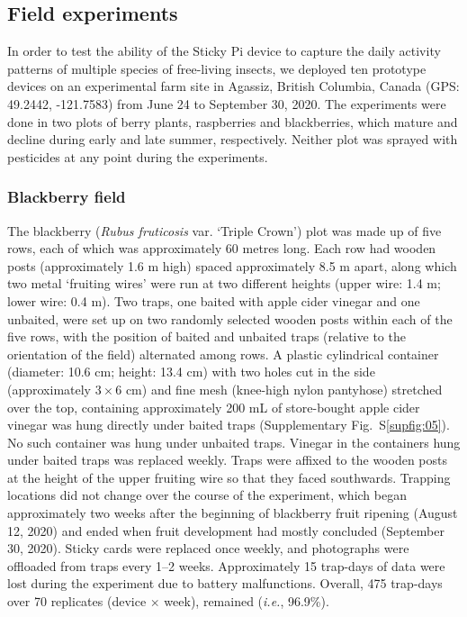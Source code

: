 \documentclass[12pt]{article}
\begin{document}
\begin{linenumbers}
		\subsection*{Field experiments}
		In order to test the ability of the Sticky Pi device to capture the daily activity patterns of multiple species of free-living insects, we deployed ten prototype devices on an experimental farm site in Agassiz, British Columbia, Canada (GPS: 49.2442, -121.7583) from June 24 to September 30, 2020. The experiments were done in two plots of berry plants, raspberries and blackberries, which mature and decline during early and late summer, respectively. Neither plot was sprayed with pesticides at any point during the experiments.
		
		\subsubsection*{Blackberry field}
		The blackberry (\emph{Rubus fruticosis} var. ‘Triple Crown’) plot was made up of five rows, each of which was approximately 60 metres long. Each row had wooden posts (approximately 1.6 m high) spaced approximately 8.5 m apart, along which two metal ‘fruiting wires’ were run at two different heights (upper wire: 1.4 m; lower wire: 0.4 m). Two traps, one baited with apple cider vinegar and one unbaited, were set up on two randomly selected wooden posts within each of the five rows, with the position of baited and unbaited traps (relative to the orientation of the field) alternated among rows. A plastic cylindrical container (diameter: 10.6 cm; height: 13.4 cm) with two holes cut in the side (approximately $3 \times{} 6$ cm) and fine mesh (knee-high nylon pantyhose) stretched over the top, containing approximately 200 mL of store-bought apple cider vinegar was hung directly under baited traps
		(Supplementary Fig.~S\ref{supfig:05}). No such container was hung under unbaited traps. Vinegar in the containers hung under baited traps was replaced weekly. Traps were affixed to the wooden posts at the height of the upper fruiting wire so that they faced southwards. Trapping locations did not change over the course of the experiment, which began approximately two weeks after the beginning of blackberry fruit ripening (August 12, 2020) and ended when fruit development had mostly concluded (September 30, 2020). Sticky cards were replaced once weekly, and photographs were offloaded from traps every 1–2 weeks. Approximately 15 trap-days of data were lost during the experiment due to battery malfunctions. Overall, 475 trap-days over 70 replicates (device $\times{}$ week), remained (\emph{i.e.}, 96.9\%).
		

\end{linenumbers}
\end{document}
